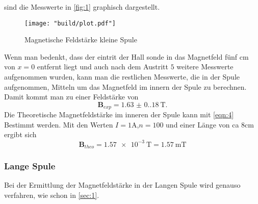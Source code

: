 sind die Messwerte in \autoref{fig:1} graphisch dargestellt.
\begin{figure}
    \caption{Magnetische Feldstärke kleine Spule}
    \label{fig:1}
    \centering
    \texttt{[image: "build/plot.pdf"]}
\end{figure}
Wenn man bedenkt, dass der eintrit der Hall sonde in das Magnetfeld fünf \unit{\centi\meter} 
von $x = 0$ entfernt liegt und auch nach dem Austritt $5$ weitere Messwerte aufgenommen wurden, 
kann man die restlichen Messwerte, die in der Spule aufgenommen, Mitteln um das Magnetfeld im 
innern der Spule zu berechnen. Damit kommt man zu einer Feldstärke von 
\begin{equation*}
    \symbf{B}_{exp} = \qty{1.63(0.18)}{\tesla}.
\end{equation*}
Die Theoretische Magnetfeldstärke im inneren der Spule kann mit \autoref{eqn:4} Bestimmt werden.
Mit den Werten $ I = 1\unit{\ampere}$,$ n = 100 $ und einer Länge von ca 8\unit{\centi\meter}
ergibt sich 
\begin{equation*}
    \symbf{B}_{theo} = \qty{1.57e-3}{\tesla} = \qty{1.57}{\milli\tesla}
\end{equation*}

\subsubsection{Lange Spule}
Bei der Ermittlung der Magnetfeldstärke in der Langen Spule wird genauso verfahren, wie schon 
in \autoref{sec:1}.
\label{sec:Auswertung}

